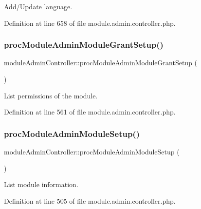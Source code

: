 Add/\+Update language. 



Definition at line 658 of file module.\+admin.\+controller.\+php.

\mbox{\label{classmoduleAdminController_aab0e773fbdbac7faf7e0073aeb94b77d}} 
\subsubsection{\texorpdfstring{proc\+Module\+Admin\+Module\+Grant\+Setup()}{procModuleAdminModuleGrantSetup()}}
{\footnotesize\ttfamily module\+Admin\+Controller\+::proc\+Module\+Admin\+Module\+Grant\+Setup (\begin{DoxyParamCaption}{ }\end{DoxyParamCaption})}



List permissions of the module. 



Definition at line 561 of file module.\+admin.\+controller.\+php.

\mbox{\label{classmoduleAdminController_a7a4a202f2249823182f5aab39709f45e}} 
\subsubsection{\texorpdfstring{proc\+Module\+Admin\+Module\+Setup()}{procModuleAdminModuleSetup()}}
{\footnotesize\ttfamily module\+Admin\+Controller\+::proc\+Module\+Admin\+Module\+Setup (\begin{DoxyParamCaption}{ }\end{DoxyParamCaption})}



List module information. 



Definition at line 505 of file module.\+admin.\+controller.\+php.

